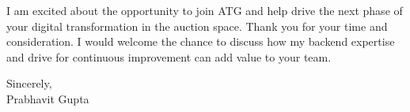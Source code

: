 \documentclass[11pt,a4paper]{article}
\begin{document}
\vspace{1em}
\noindent
I am excited about the opportunity to join ATG and help drive the next phase of your digital transformation in the auction space. Thank you for your time and consideration. I would welcome the chance to discuss how my backend expertise and drive for continuous improvement can add value to your team.

\vspace{1em}
\noindent
Sincerely, \\
\vspace{1em}
\noindent
Prabhavit Gupta
\end{document}
